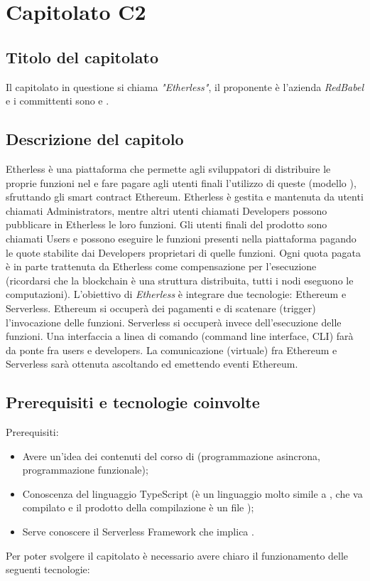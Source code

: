 \section{Capitolato C2}
\subsection{Titolo del capitolato}
Il capitolato in questione si chiama \textit{"Etherless"}, il proponente è l'azienda \textit{RedBabel} e i committenti sono \VT{} e \CR{}.

\subsection{Descrizione del capitolo}
Etherless è una piattaforma che permette agli sviluppatori di distribuire le proprie funzioni  nel  e fare pagare agli utenti finali l'utilizzo di queste (modello ), sfruttando gli smart contract Ethereum. 
Etherless è gestita e mantenuta da utenti chiamati Administrators, mentre altri utenti chiamati Developers possono pubblicare in Etherless le loro funzioni. Gli utenti finali del prodotto sono chiamati Users e possono eseguire le funzioni presenti nella piattaforma pagando le quote stabilite dai Developers proprietari di quelle funzioni. Ogni quota pagata è in parte trattenuta da Etherless come compensazione per l'esecuzione (ricordarsi che la blockchain è una struttura distribuita, tutti i nodi eseguono le computazioni).
L'obiettivo di \textit{Etherless} è integrare due tecnologie: Ethereum e Serverless. Ethereum si occuperà dei pagamenti e di scatenare (trigger) l'invocazione delle funzioni. Serverless si occuperà invece dell'esecuzione delle funzioni. Una interfaccia a linea di comando (command line interface, CLI) farà da ponte fra users e developers. La comunicazione (virtuale) fra Ethereum e Serverless sarà ottenuta ascoltando ed emettendo eventi Ethereum.

\subsection{Prerequisiti e tecnologie coinvolte}
Prerequisiti:
\begin{itemize}
\item Avere un'idea dei contenuti del corso di  (programmazione asincrona, programmazione funzionale);
\item Conoscenza del linguaggio TypeScript (\`e un linguaggio molto simile a , che va compilato e il prodotto della compilazione \`e un file );
\item Serve conoscere il Serverless Framework che implica .
\end{itemize}
Per poter svolgere il capitolato \`e necessario avere chiaro il funzionamento delle seguenti tecnologie:

